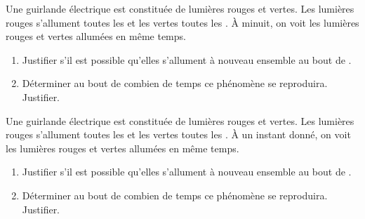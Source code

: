 \begin{exercice*}
    Une guirlande électrique est constituée de lumières rouges et vertes.
    Les lumières rouges s'allument toutes les  et les vertes toutes les .
    À minuit, on voit les lumières rouges et vertes allumées en même temps.
    \begin{enumerate}
        \item Justifier s'il est possible qu'elles s'allument à nouveau ensemble au bout de .
        \item Déterminer au bout de combien de temps ce phénomène se reproduira. Justifier.
    \end{enumerate}    
\end{exercice*}
\begin{corrige}
        Une guirlande électrique est constituée de lumières rouges et vertes.
        Les lumières rouges s'allument toutes les  et les vertes toutes les .
        À un instant donné, on voit les lumières rouges et vertes allumées en même temps.
    
        \begin{enumerate}
            \item Justifier s'il est possible qu'elles s'allument à nouveau ensemble au bout de .
            
            {}            
            \item Déterminer au bout de combien de temps ce phénomène se reproduira. Justifier.


        \end{enumerate}                    
\end{corrige}

